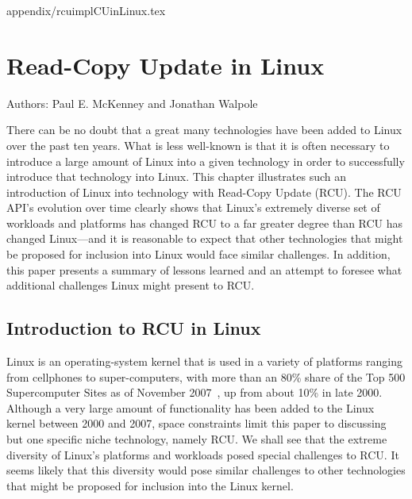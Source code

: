appendix/rcuimplCUinLinux.tex

\chapter{Read-Copy Update in Linux}
\label{app:rcuhist:Read-Copy Update in Linux}


Authors: Paul E. McKenney and Jonathan Walpole

There can be no doubt that a great many technologies have been
added to Linux over the past ten years.
What is less well-known is that it is often necessary to
introduce a large amount of Linux into a given technology in order
to successfully introduce that technology into Linux.
This chapter illustrates such an introduction of Linux into
technology with Read-Copy Update (RCU).
The RCU API's evolution over time clearly shows that Linux's
extremely diverse set of workloads and platforms has
changed RCU to a far greater degree than RCU has changed
Linux---and it
is reasonable to expect that other technologies that might
be proposed for inclusion into Linux would face similar challenges.
In addition, this paper presents a summary of lessons learned and
an attempt to foresee what additional challenges Linux
might present to RCU.

\section{Introduction to RCU in Linux}
\label{sec:app:rcuhist:Introduction to RCU in Linux}

Linux is an operating-system kernel that is used in a variety of
platforms ranging from cellphones to super-computers,
with more than an 80\% share of the Top 500 Supercomputer Sites
as of November 2007~\cite{Top500byOS}, up from about 10\% in late 2000.
Although a very large amount of functionality has been added to the
Linux kernel between 2000 and 2007, space constraints limit this paper to
discussing but one specific niche technology, namely RCU.
We shall see that the extreme diversity of Linux's platforms and
workloads posed special challenges to RCU.
It seems likely that this diversity would pose similar challenges to
other technologies that might be proposed for inclusion into the
Linux kernel.

